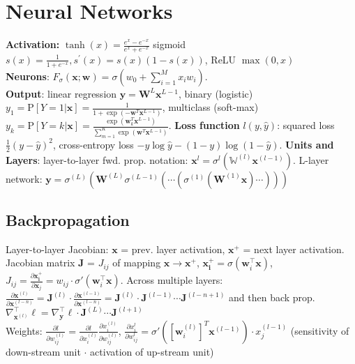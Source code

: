 \section{Neural Networks}
\textbf{Activation:} $\tanh(x)=\frac{e^x-e^{-x}}{e^x+e^{-x}}$ sigmoid $s(x)= \frac{1}{1+e^{-x}},s^{'}(x)=s(x)(1-s(x))$, ReLU $\max(0,x)$\\
\textbf{Neurons}: $F_\sigma(\mathbf{x};\mathbf{w}) = \sigma(w_0 + \sum_{i=1}^M{x_iw_i})$.\\ \textbf{Output}: linear regression $\mathbf{y} = \mathbf{W}^L\mathbf{x}^{L-1}$, binary (logistic) $y_1 = \text{P}[Y=1|\mathbf{x}] = \frac{1}{1 + \exp(-\mathbf{w}^T \mathbf{x}^{L-1})}$, multiclass (soft-max) $y_k = \text{P}[Y=k|\mathbf{x}]= \frac{\exp( \mathbf{w}_k^T\mathbf{x}^{L-1})}{\sum_{m=1}^{K}{\exp(\mathbf{w}^T\mathbf{x}^{L-1})}}$.
\textbf{Loss function} $l(y, \hat{y})$: squared loss $\frac{1}{2}(y - \hat{y})^2$, cross-entropy loss $-y \log \hat{y} - (1-y)\log(1-\hat{y})$.  \textbf{Units and Layers}: layer-to-layer fwd. prop. notation: $\mathbf{x}^{l} = \sigma^{l}\left(\mathbb{W}^{\left(l\right)}\mathbf{x}^{\left(l-1\right)}\right)$. L-layer network: $\mathbf{y}=\sigma^{\left(L\right)}\left(\mathbf{W}^(L)\sigma^{(L-1)}\left(\cdots\left(\sigma^{(1)}\left(\mathbf{W}^{(1)}\mathbf{x}\right)\cdots\right)\right)\right)$

\subsection*{Backpropagation}
Layer-to-layer Jacobian: $\mathbf{x}$ = prev. layer activation, $\mathbf{x^+}$ = next layer activation. Jacobian matrix $\mathbf{J}$ = $J_{ij}$ of mapping $\mathbf{x}\rightarrow\mathbf{x^+}$, $\mathbf{x_i^+} = \sigma(\mathbf{w}_i^\top\mathbf{x})$, $J_{ij} = \frac{\partial \mathbf{x_i^+}}{\partial \mathbf{x}_j} = w_{ij}\cdot\sigma'(\mathbf{w}_i^\top\mathbf{x})$. Across multiple layers: $\frac{\partial\mathbf{x}^{(l)}}{\partial\mathbf{x}^{(l-n)}} = \mathbf{J}^{(l)}\cdot\frac{\partial\mathbf{x}^{(l-1)}}{\partial\mathbf{x}^{(l-n)}}=\mathbf{J}^{(l)}\cdot\mathbf{J}^{(l-1)}\cdots\mathbf{J}^{(l-n+1)}$ and then back prop. $ \nabla_{\mathbf{x}^{(l)}}^\top\ell=\nabla_{\mathbf{y}}^\top\ell\cdot\mathbf{J}^{(L)}\cdots\mathbf{J}^{(l+1)}$\\
Weights: $\frac{\partial l}{\partial w_{ij}^{(l)}} = \frac{\partial l}{\partial x_i^{(l)}}\frac{\partial x_i^{(l)}}{\partial w_{ij}^{(l)}}$, $\frac{\partial x_i^{l}}{\partial w_{ij}^{l}} = \sigma'([\mathbf{w}_i^{(l)}]^T \mathbf{x}^{(l-1)})\cdot x_j^{(l-1)}$ (sensitivity of down-stream unit $\cdot$ activation of up-stream unit)

